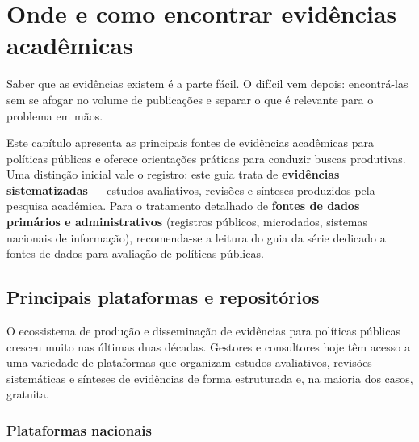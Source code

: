 \documentclass[12pt, a4paper, openany]{book}
\begin{document}
\chapter{Onde e como encontrar evidências acadêmicas}\label{cap2}

Saber que as evidências existem é a parte fácil. O difícil vem depois: encontrá-las sem se afogar no volume de publicações e separar o que é relevante para o problema em mãos.

Este capítulo apresenta as principais fontes de evidências acadêmicas para
políticas públicas e oferece orientações práticas para conduzir buscas
produtivas. Uma distinção inicial vale o registro: este guia trata de
\textbf{evidências sistematizadas} --- estudos avaliativos, revisões e
sínteses produzidos pela pesquisa acadêmica. Para o tratamento detalhado de
\textbf{fontes de dados primários e administrativos} (registros públicos,
microdados, sistemas nacionais de informação), recomenda-se a leitura do guia
da série dedicado a fontes de dados para avaliação de políticas públicas.

\section{Principais plataformas e repositórios}

O ecossistema de produção e disseminação de evidências para políticas públicas
cresceu muito nas últimas duas décadas. Gestores e consultores hoje têm
acesso a uma variedade de plataformas que organizam estudos avaliativos,
revisões sistemáticas e sínteses de evidências de forma estruturada e, na
maioria dos casos, gratuita.

\subsection{Plataformas nacionais}
\end{document}
